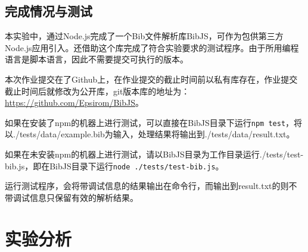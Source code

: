 \documentclass[a4paper]{article}
\begin{document}
\begin{CJK*}{UTF8}{gbsn}
{
}

    \subsection{完成情况与测试}
    \label{sec:abouttest}
    本实验中，通过Node.js完成了一个Bib文件解析库BibJS，可作为包供第三方Node.js应用引入。还借助这个库完成了符合实验要求的测试程序。由于所用编程语言是脚本语言，因此不需要提交可执行的版本。
    \par 本次作业提交在了Github上，在作业提交的截止时间前以私有库存在，作业提交截止时间后就修改为公开库，git版本库的地址为：\href{https://github.com/Epsirom/BibJS}{https://github.com/Epsirom/BibJS}。
    \par 如果在安装了npm的机器上进行测试，可以直接在BibJS目录下运行\lstinline[language=sh]{npm test}，将以./tests/data/example.bib为输入，处理结果将输出到./tests/data/result.txt。
    \par 如果在未安装npm的机器上进行测试，请以BibJS目录为工作目录运行./tests/test-bib.js，即在BibJS目录下运行\lstinline{node ./tests/test-bib.js}。
    \par 运行测试程序，会将带调试信息的结果输出在命令行，而输出到result.txt的则不带调试信息只保留有效的解析结果。

    \section{实验分析}

\end{CJK*}
\end{document}
